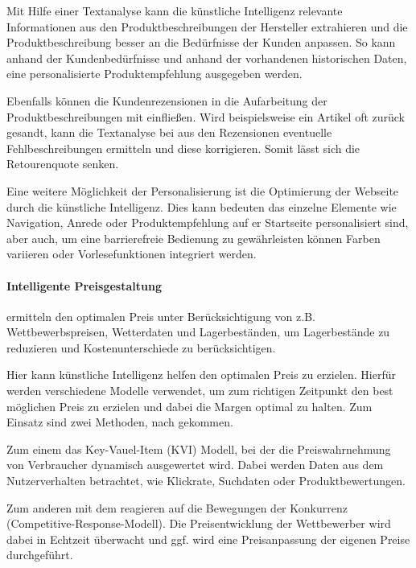 Mit Hilfe einer Textanalyse kann die künstliche Intelligenz relevante Informationen aus den Produktbeschreibungen der Hersteller extrahieren und die Produktbeschreibung besser an die Bedürfnisse der Kunden anpassen. So kann anhand der Kundenbedürfnisse und anhand der vorhandenen historischen Daten, eine personalisierte Produktempfehlung ausgegeben werden.\vspace{0.2cm}

Ebenfalls können die Kundenrezensionen in die Aufarbeitung der Produktbeschreibungen mit einfließen. Wird beispielsweise ein Artikel oft zurück gesandt, kann die Textanalyse bei  aus den Rezensionen eventuelle Fehlbeschreibungen ermitteln und diese korrigieren. Somit lässt sich die Retourenquote senken.\vspace{0.2cm}

Eine weitere Möglichkeit der Personalisierung ist die Optimierung der Webseite durch die künstliche Intelligenz. Dies kann bedeuten das einzelne Elemente wie Navigation, Anrede oder Produktempfehlung auf er Startseite personalisiert sind, aber auch, um eine barrierefreie Bedienung zu gewährleisten können Farben variieren oder Vorlesefunktionen integriert werden.

\paragraph{Intelligente Preisgestaltung} ermitteln den optimalen Preis unter Berücksichtigung von z.B. Wettbewerbspreisen, Wetterdaten und Lagerbeständen, um Lagerbestände zu reduzieren und Kostenunterschiede zu berücksichtigen.\vspace{0.2cm}

Hier kann künstliche Intelligenz helfen den optimalen Preis zu erzielen. Hierfür werden verschiedene Modelle verwendet, um zum richtigen Zeitpunkt den best möglichen Preis zu erzielen und dabei die Margen optimal zu halten. Zum Einsatz sind zwei Methoden, nach \cite{mckinsey_dynamic_pricing} gekommen.\vspace{0.2cm}

Zum einem das Key-Vauel-Item (KVI) Modell, bei der die Preiswahrnehmung von Verbraucher dynamisch ausgewertet wird. Dabei werden Daten aus dem Nutzerverhalten betrachtet, wie Klickrate, Suchdaten oder Produktbewertungen.\vspace{0.2cm}

Zum anderen mit dem reagieren auf die Bewegungen der Konkurrenz (Competitive-Response-Modell). Die Preisentwicklung der Wettbewerber wird dabei in Echtzeit überwacht und ggf. wird eine Preisanpassung der eigenen Preise durchgeführt.\vspace{0.2cm}

